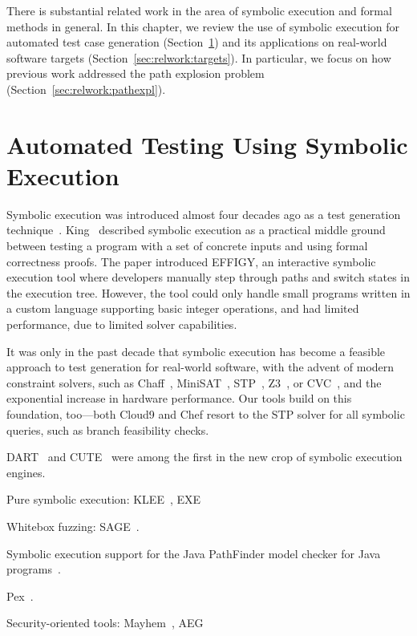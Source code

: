 There is substantial related work in the area of symbolic execution and formal methods in general.  In this chapter, we review the use of symbolic execution for automated test case generation (Section~\ref{sec:relwork:atcg}) and its applications on real-world software targets (Section~\ref{sec:relwork:targets}).  In particular, we focus on how previous work addressed the path explosion problem (Section~\ref{sec:relwork:pathexpl}).

\section{Automated Testing Using Symbolic Execution}
\label{sec:relwork:atcg}

Symbolic execution was introduced almost four decades ago as a test generation technique~\cite{king:symbolic:2, boyer:symbolic}.  King~\cite{king:symbolic:2} described symbolic execution as a practical middle ground between testing a program with a set of concrete inputs and using formal correctness proofs.  The paper introduced EFFIGY, an interactive symbolic execution tool where developers manually step through paths and switch states in the execution tree.  However, the tool could only handle small programs written in a custom language supporting basic integer operations, and had limited performance, due to limited solver capabilities.

It was only in the past decade that symbolic execution has become a feasible approach to test generation for real-world software, with the advent of modern constraint solvers, such as Chaff~\cite{chaff}, MiniSAT~\cite{minisat}, STP~\cite{stp}, Z3~\cite{Z3}, or CVC~\cite{cvc}, and the exponential increase in hardware performance.  Our tools build on this foundation, too---both Cloud9 and Chef resort to the STP solver for all symbolic queries, such as branch feasibility checks.

DART~\cite{dart} and CUTE~\cite{cute} were among the first in the new crop of symbolic execution engines.  

Pure symbolic execution: KLEE~\cite{klee}, EXE~\cite{exe}

Whitebox fuzzing: SAGE~\cite{sage2012,godefroid:fuzz}.

Symbolic execution support for the Java PathFinder model checker for Java programs~\cite{jpf-symbex}.

Pex~\cite{tillmann-pex}.

Security-oriented tools: Mayhem~\cite{mayhem}, AEG~\cite{aeg}

